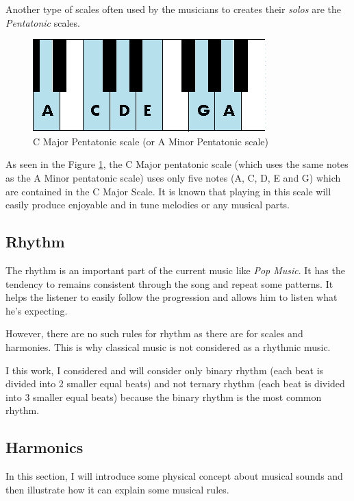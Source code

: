 \documentclass[12pt]{report}
\begin{document}
Another type of scales often used by the musicians to creates their \textit{solos} are the \textit{Pentatonic} scales.


\begin{figure}[H]
    \centering
    \includegraphics[width=0.5 \textwidth]{images/music/piano/pentatonic_scale.png}
    \caption{C Major Pentatonic scale (or A Minor Pentatonic scale)}
    \label{fig:pentatonic_scale_piano}
\end{figure}

As seen in the Figure \ref{fig:pentatonic_scale_piano}, the C Major pentatonic scale (which uses the same notes as the A Minor pentatonic scale) uses only five notes (A, C, D, E and G) which are contained in the C Major Scale. It is known that playing in this scale will easily produce enjoyable and in tune melodies or any musical parts. 


\subsection{Rhythm}

The rhythm is an important part of the current music like \textit{Pop Music}. It has the tendency to remains consistent through the song and repeat some patterns. It helps the listener to easily follow the progression and allows him to listen what he's expecting.

However, there are no such rules for rhythm as there are for scales and harmonies. This is why classical music is not considered as a rhythmic music.

I this work, I considered and will consider only binary rhythm (each beat is divided into 2 smaller equal beats) and not ternary rhythm (each beat is divided into 3 smaller equal beats) because the binary rhythm is the most common rhythm.

\subsection{Harmonics}

In this section, I will introduce some physical concept about musical sounds and then illustrate how it can explain some musical rules.
\end{document}
